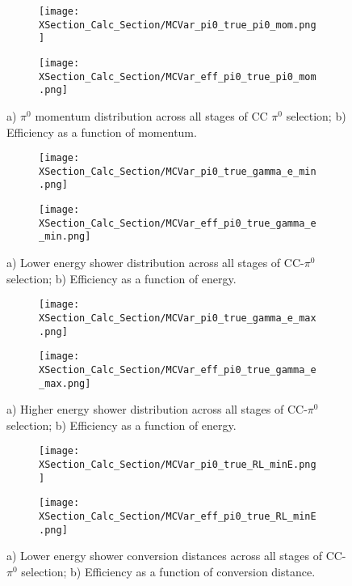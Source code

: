 \begin{figure}[t!]
  \begin{subfigure}[t]{0.39\textwidth}
\texttt{[image: XSection\_Calc\_Section/MCVar\_pi0\_true\_pi0\_mom.png]}
  \caption{ }
  \end{subfigure} 
  \hspace{15mm}
  \begin{subfigure}[t]{0.39\textwidth}
\texttt{[image: XSection\_Calc\_Section/MCVar\_eff\_pi0\_true\_pi0\_mom.png]}
  \caption{ }
  \end{subfigure} 
\caption{a) $\pi^0$ momentum distribution across all stages of CC $\pi^0$ selection; b) Efficiency as a function of momentum. }
\label{fig:pi0_effs_1}
\end{figure}

\begin{figure}[h!]
  \begin{subfigure}[t]{0.39\textwidth}
\texttt{[image: XSection\_Calc\_Section/MCVar\_pi0\_true\_gamma\_e\_min.png]}
  \caption{ }
  \end{subfigure} 
  \hspace{15mm}
  \begin{subfigure}[t]{0.39\textwidth}
\texttt{[image: XSection\_Calc\_Section/MCVar\_eff\_pi0\_true\_gamma\_e\_min.png]}
  \caption{ }
  \end{subfigure} 
\caption{a) Lower energy shower distribution across all stages of CC-$\pi^0$ selection; b) Efficiency as a function of energy. }
\label{fig:pi0_effs_2}
\end{figure}

\begin{figure}[h!]
  \begin{subfigure}[t]{0.39\textwidth}
\texttt{[image: XSection\_Calc\_Section/MCVar\_pi0\_true\_gamma\_e\_max.png]}
  \caption{ }
  \end{subfigure} 
  \hspace{15mm}
  \begin{subfigure}[t]{0.39\textwidth}
\texttt{[image: XSection\_Calc\_Section/MCVar\_eff\_pi0\_true\_gamma\_e\_max.png]}
  \caption{ }
  \end{subfigure} 
\caption{a) Higher energy shower distribution across all stages of CC-$\pi^0$ selection; b) Efficiency as a function of energy. }
\label{fig:pi0_effs_3}
\end{figure}

\begin{figure}[h!]
  \begin{subfigure}[t]{0.39\textwidth}
\texttt{[image: XSection\_Calc\_Section/MCVar\_pi0\_true\_RL\_minE.png]}
  \caption{ }
  \end{subfigure} 
  \hspace{15mm}
  \begin{subfigure}[t]{0.39\textwidth}
\texttt{[image: XSection\_Calc\_Section/MCVar\_eff\_pi0\_true\_RL\_minE.png]}
  \caption{ }
  \end{subfigure} 
\caption{a) Lower energy shower conversion distances across all stages of CC-$\pi^0$ selection; b) Efficiency as a function of conversion distance. }
\label{fig:pi0_effs_4}
\end{figure}

